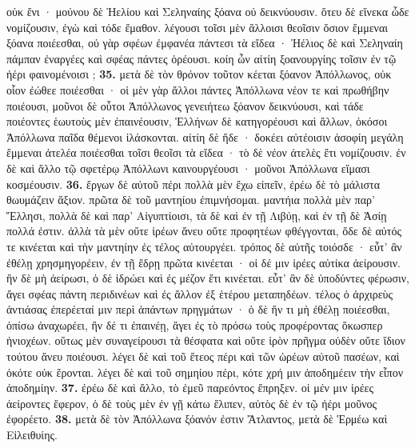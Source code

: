 \documentclass[a4paper, 11pt, oneside, polutonikogreek, german]{article}
\begin{document}
οὐκ ἔνι · μούνου δὲ Ἠελίου καὶ Σεληναίης ξόανα οὐ δεικνύουσιν. ὅτευ δὲ εἵνεκα ὧδε νομίζουσιν, ἐγὼ καὶ τόδε ἔμαθον. λέγουσι τοῖσι μὲν ἄλλοισι θεοῖσιν ὅσιον ἔμμεναι ξόανα ποιέεσθαι, οὐ γὰρ σφέων ἐμφανέα πάντεσι τὰ εἴδεα · Ἠέλιος δὲ καὶ Σεληναίη πάμπαν ἐναργέες καὶ σφέας πάντες ὁρέουσι. κοίη ὦν αἰτίη ξοανουργίης τοῖσιν ἐν τῷ ἠέρι φαινομένοισι ; \textbf{35.} μετὰ δὲ τὸν θρόνον τοῦτον κέεται ξόανον Ἀπόλλωνος, οὐκ οἷον ἐώθεε ποιέεσθαι · οἱ μὲν γὰρ ἄλλοι πάντες Ἀπόλλωνα νέον τε καὶ πρωθήβην ποιέουσι, μοῦνοι δὲ οὗτοι Ἀπόλλωνος γενειήτεω ξόανον δεικνύουσι, καὶ τάδε ποιέοντες ἑωυτοὺς μὲν ἐπαινέουσιν, Ἑλλήνων δὲ κατηγορέουσι καὶ ἄλλων, ὁκόσοι Ἀπόλλωνα παῖδα θέμενοι ἱλάσκονται. αἰτίη δὲ ἥδε · δοκέει αὐτέοισιν ἀσοφίη μεγάλη ἔμμεναι ἀτελέα ποιέεσθαι τοῖσι θεοῖσι τὰ εἴδεα · τὸ δὲ νέον ἀτελὲς ἔτι νομίζουσιν. ἐν δὲ καὶ ἄλλο τῷ σφετέρῳ Ἀπόλλωνι καινουργέουσι · μοῦνοι Ἀπόλλωνα εἵμασι κοσμέουσιν. \textbf{36.} ἔργων δὲ αὐτοῦ πέρι πολλὰ μὲν ἔχω εἰπεῖν, ἐρέω δὲ τὸ μάλιστα θωυμάζειν ἄξιον. πρῶτα δὲ τοῦ μαντηίου ἐπιμνήσομαι. μαντήια πολλὰ μὲν παρ' Ἕλλησι, πολλὰ δὲ καὶ παρ' Αἰγυπτίοισι, τὰ δὲ καὶ ἐν τῇ Λιβύῃ, καὶ ἐν τῇ δὲ Ἀσίῃ πολλά ἐστιν. ἀλλὰ τὰ μὲν οὔτε ἱρέων ἄνευ οὔτε προφητέων φθέγγονται, ὅδε δὲ αὐτός τε κινέεται καὶ τὴν μαντηίην ἐς τέλος αὐτουργέει. τρόπος δὲ αὐτῆς τοιόσδε · εὖτ' ἂν ἐθέλῃ χρησμηγορέειν, ἐν τῇ ἕδρῃ πρῶτα κινέεται · οἱ δέ μιν ἱρέες αὐτίκα ἀείρουσιν. ἢν δὲ μὴ ἀείρωσι, ὁ δὲ ἱδρώει καὶ ἐς μέζον ἔτι κινέεται. εὖτ' ἂν δὲ ὑποδύντες φέρωσιν, ἄγει σφέας πάντη περιδινέων καὶ ἐς ἄλλον ἐξ ἑτέρου μεταπηδέων. τέλος ὁ ἀρχιρεὺς ἀντιάσας ἐπερέεταί μιν περὶ ἁπάντων πρηγμάτων · ὁ δὲ ἤν τι μὴ ἐθέλῃ ποιέεσθαι, ὀπίσω ἀναχωρέει, ἢν δέ τι ἐπαινέῃ, ἄγει ἐς τὸ πρόσω τοὺς προφέροντας ὅκωσπερ ἡνιοχέων. οὕτως μὲν συναγείρουσι τὰ θέσφατα καὶ οὔτε ἱρὸν πρῆγμα οὐδὲν οὔτε ἴδιον τούτου ἄνευ ποιέουσι. λέγει δὲ καὶ τοῦ ἔτεος πέρι καὶ τῶν ὡρέων αὐτοῦ πασέων, καὶ ὁκότε οὐκ ἔρονται. λέγει δὲ καὶ τοῦ σημηίου πέρι, κότε χρή μιν ἀποδημέειν τὴν εἶπον ἀποδημίην. \textbf{37.} ἐρέω δὲ καὶ ἄλλο, τὸ ἐμεῦ παρεόντος ἔπρηξεν. οἱ μέν μιν ἱρέες ἀείροντες ἔφερον, ὁ δὲ τοὺς μὲν ἐν γῇ κάτω ἔλιπεν, αὐτὸς δὲ ἐν τῷ ἠέρι μοῦνος ἐφορέετο. \textbf{38.} μετὰ δὲ τὸν Ἀπόλλωνα ξόανόν ἐστιν Ἄτλαντος, μετὰ δὲ Ἑρμέω καὶ Εἰλειθυίης.
\end{document}
